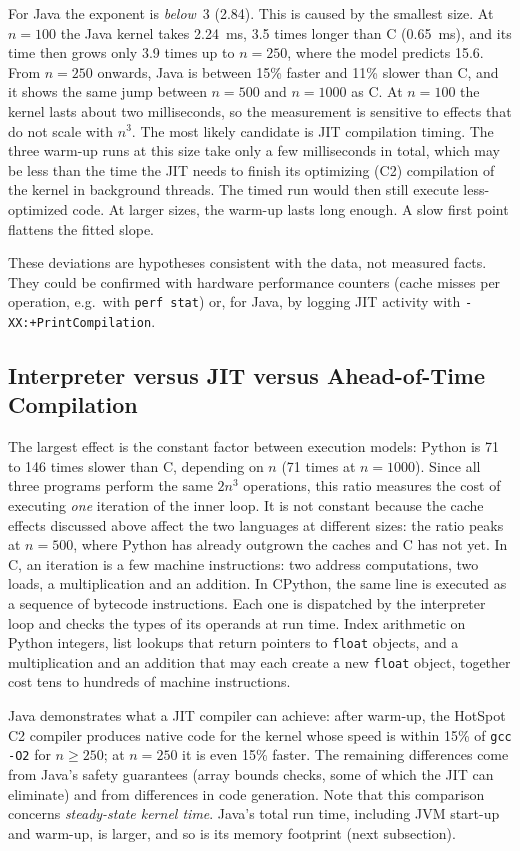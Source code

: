 \documentclass[conference,a4paper]{IEEEtran}
\newcommand{\code}[1]{\texttt{#1}}
\begin{document}
For Java the exponent is \emph{below}~3 (2.84). This is caused by the smallest
size. At $n=100$ the Java kernel takes 2.24~ms, 3.5 times longer than C
(0.65~ms), and its time then grows only 3.9 times up to $n=250$, where the
model predicts 15.6. From $n=250$ onwards, Java is between 15\% faster and 11\%
slower than C, and it shows the same jump between $n=500$ and $n=1000$ as C.
At $n=100$ the kernel lasts about two milliseconds, so the measurement is
sensitive to effects that do not scale with $n^3$. The most likely candidate is
JIT compilation timing. The three warm-up runs at this size take only a few
milliseconds in total, which may be less than the time the JIT needs to finish
its optimizing (C2) compilation of the kernel in background threads. The timed
run would then still execute less-optimized code. At larger sizes, the warm-up
lasts long enough. A slow first point flattens the fitted slope.

These deviations are hypotheses consistent with the data, not measured facts.
They could be confirmed with hardware performance counters (cache misses per
operation, e.g.\ with \code{perf stat}) or, for Java, by logging JIT activity
with \code{-XX:+PrintCompilation}.

\subsection{Interpreter versus JIT versus Ahead-of-Time Compilation}
The largest effect is the constant factor between execution models: Python is
71 to 146 times slower than C, depending on $n$ (71 times at $n=1000$). Since
all three programs perform the same $2n^3$ operations, this ratio measures the
cost of executing \emph{one} iteration of the inner loop. It is not constant
because the cache effects discussed above affect the two languages at
different sizes: the ratio peaks at $n=500$, where Python has already outgrown
the caches and C has not yet. In C, an iteration is a few machine
instructions: two address computations, two loads, a multiplication and an
addition. In CPython, the same line is executed as a sequence of bytecode
instructions. Each one is dispatched by the interpreter loop and checks the
types of its operands at run time. Index arithmetic on Python integers, list
lookups that return pointers to \code{float} objects, and a multiplication and
an addition that may each create a new \code{float} object, together cost
tens to hundreds of machine instructions.

Java demonstrates what a JIT compiler can achieve: after warm-up, the HotSpot C2
compiler produces native code for the kernel whose speed is within 15\% of
\code{gcc -O2} for $n \ge 250$; at $n=250$ it is even 15\% faster. The
remaining differences come from Java's
safety guarantees (array bounds checks, some of which the JIT can eliminate)
and from differences in code generation. Note that this comparison concerns
\emph{steady-state kernel time}. Java's total run time, including JVM start-up
and warm-up, is larger, and so is its memory footprint (next subsection).
\end{document}
